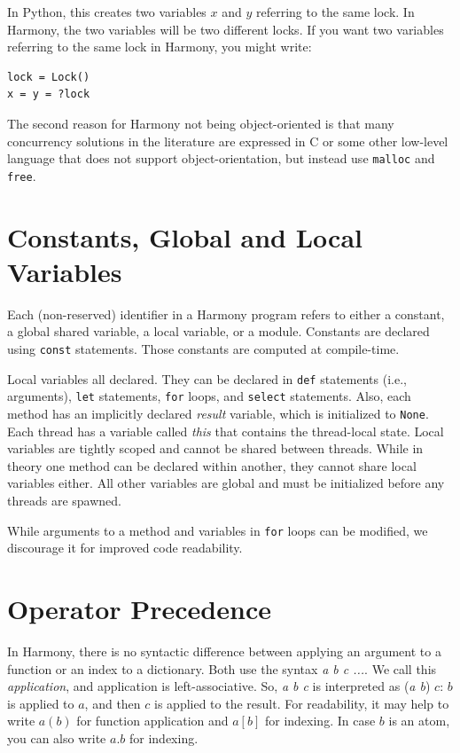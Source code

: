 \documentclass{report}
\newenvironment{code}{
\tcolorbox
}{
\endtcolorbox
}
\begin{document}
In Python, this creates two variables $x$ and $y$ referring to the same lock.
In Harmony, the two variables will be two different locks.  If you want two
variables referring to the same lock in Harmony, you might write:

\begin{code}
\begin{verbatim}
lock = Lock()
x = y = ?lock
\end{verbatim}
\end{code}

The second reason for Harmony not being object-oriented is that
many concurrency solutions in the literature are
expressed in C or some other low-level language that does not support
object-orientation, but instead use \texttt{malloc} and \texttt{free}.

\section{Constants, Global and Local Variables}\label{sec:vars}

Each (non-reserved) identifier in a Harmony program refers to either
a constant, a global shared variable, a local variable, or a module.
Constants are declared using \texttt{const} statements.
Those constants are computed at compile-time.

Local variables all declared.  They can be declared in
\texttt{def} statements (i.e., arguments),
\texttt{let} statements, \texttt{for} loops, and \texttt{select} statements.
Also, each method has an implicitly declared
\textit{result} variable, which is initialized to \texttt{None}.
Each thread has a variable called \textit{this} that contains
the thread-local state.
Local variables are tightly scoped and cannot be shared
between threads.
While in theory one method can be declared within another,
they cannot share local variables either.
All other variables are global and must be initialized
before any threads are spawned.

While arguments to a method and variables in \texttt{for} loops
can be modified, we discourage it for improved code readability.

\section{Operator Precedence}

In Harmony, there is no syntactic difference between applying an argument to a function
or an index to a dictionary.  Both use the syntax \textit{a b c ...}.
We call this \emph{application}, and application is left-associative.
So, \textit{a b c} is interpreted as (\textit{a b}) $c$: $b$ is applied to $a$,
and then $c$ is applied to the result.
For readability, it may help to write $a(b)$ for function application and
$a[b]$ for indexing.  In case $b$ is an atom, you can also write $a.b$ for indexing.
\end{document}
